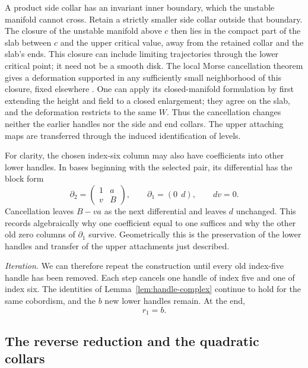 A product side collar has an invariant inner boundary, which the
unstable manifold cannot cross.  Retain a strictly smaller side collar
outside that boundary.  The closure of the unstable manifold above
$c$ then lies in the compact part of the slab between $c$ and the
upper critical value, away from the retained collar and the slab's ends.
This closure can include limiting trajectories through the lower
critical point; it need not be a smooth disk.
The local Morse cancellation theorem gives a deformation supported
in any sufficiently small neighborhood of this closure, fixed elsewhere
\cite[Theorem and Corollary~1]{Laudenbach2013}.
One can apply its closed-manifold formulation by first extending the
height and field to a closed enlargement; they agree on the slab,
and the deformation restricts to the same $W$.
Thus the cancellation changes neither the earlier handles nor the
side and end collars.  The upper attaching maps are transferred
through the induced identification of levels.

For clarity, the chosen index-six column may also have coefficients
into other lower handles.  In bases beginning with the selected pair,
its differential has the block form
\[
 \partial_2=
 \begin{pmatrix}1&a\\ v&B\end{pmatrix},
 \qquad \partial_1=(0\ \ d),\qquad dv=0.
\]
Cancellation leaves $B-va$ as the next differential and leaves $d$
unchanged.  This records algebraically why one coefficient equal to
one suffices and why the other old zero columns of $\partial_1$
survive.  Geometrically this is the preservation of the lower handles
and transfer of the upper attachments just described.

\smallskip
\noindent\emph{Iteration.}
We can therefore repeat the construction until every old index-five
handle has been removed.  Each step cancels one handle of index five
and one of index six.  The identities of Lemma~\ref{lem:handle-complex}
continue to hold for the same cobordism, and the $b$ new lower handles
remain.  At the end,
\[
 r_1=b.
\]

\subsection{The reverse reduction and the quadratic collars}

